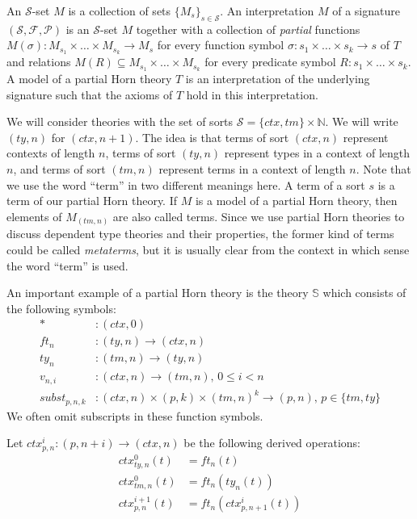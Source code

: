 \documentclass{mscs}
\newcommand{\subst}{\mathit{subst}}
\newcommand{\emptyCtx}{*}
\newcommand{\substTh}{\mathbb{S}}
\numberwithin{figure}{section}
\begin{document}
An $\mathcal{S}$-set $M$ is a collection of sets $\{ M_s \}_{s \in \mathcal{S}}$.
An interpretation $M$ of a signature $(\mathcal{S},\mathcal{F},\mathcal{P})$ is an $\mathcal{S}$-set $M$
together with a collection of \emph{partial} functions $M(\sigma) : M_{s_1} \times \ldots \times M_{s_k} \to M_s$
for every function symbol $\sigma : s_1 \times \ldots \times s_k \to s$ of $T$
and relations $M(R) \subseteq M_{s_1} \times \ldots \times M_{s_k}$ for every predicate symbol $R : s_1 \times \ldots \times s_k$.
A model of a partial Horn theory $T$ is an interpretation of the underlying signature such that the axioms of $T$ hold in this interpretation.

We will consider theories with the set of sorts $\mathcal{S} = \{ ctx, tm \} \times \mathbb{N}$.
We will write $(ty,n)$ for $(ctx,n+1)$.
The idea is that terms of sort $(ctx,n)$ represent contexts of length $n$,
terms of sort $(ty,n)$ represent types in a context of length $n$,
and terms of sort $(tm,n)$ represent terms in a context of length $n$.
Note that we use the word ``term'' in two different meanings here.
A term of a sort $s$ is a term of our partial Horn theory.
If $M$ is a model of a partial Horn theory, then elements of $M_{(tm,n)}$ are also called terms.
Since we use partial Horn theories to discuss dependent type theories and their properties, the former kind of terms could be called \emph{metaterms},
but it is usually clear from the context in which sense the word ``term'' is used.

An important example of a partial Horn theory is the theory $\substTh$ which consists of the following symbols:
\begin{align*}
\emptyCtx     & : (ctx,0) \\
ft_n          & : (ty,n) \to (ctx,n) \\
ty_n          & : (tm,n) \to (ty,n) \\
v_{n,i}       & : (ctx,n) \to (tm,n) \text{, } 0 \leq i < n \\
\subst_{p,n,k} & : (ctx,n) \times (p,k) \times (tm,n)^k \to (p,n) \text{, } p \in \{ tm, ty \}
\end{align*}
We often omit subscripts in these function symbols.

Let $ctx^i_{p,n} : (p,n+i) \to (ctx,n)$ be the following derived operations:
\begin{align*}
ctx^0_{ty,n}(t) & = ft_n(t) \\
ctx^0_{tm,n}(t) & = ft_n(ty_n(t)) \\
ctx^{i+1}_{p,n}(t) & = ft_n(ctx^i_{p,n+1}(t))
\end{align*}
\end{document}
